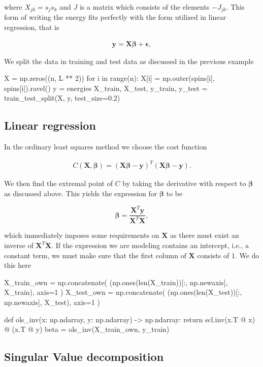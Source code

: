 \documentclass[%
oneside,                 %
final,                   %
10pt]{article}
\begin{document}
where $X_{jk} = s_j s_k$ and $J$ is a matrix which consists of the
elements $-J_{jk}$. This form of writing the energy fits perfectly
with the form utilized in linear regression, that is

\begin{align}
    \bm{y} = \bm{X}\bm{\beta} + \bm{\epsilon},
\end{align}

We split the data in training and test data as discussed in the previous example

\bpycod
X = np.zeros((n, L ** 2))
for i in range(n):
    X[i] = np.outer(spins[i], spins[i]).ravel()
y = energies
X_train, X_test, y_train, y_test = train_test_split(X, y, test_size=0.2)
\epycod

\subsection{Linear regression}

In the ordinary least squares method we choose the cost function

\begin{align}
    C(\bm{X}, \bm{\beta})= (\bm{X}\bm{\beta} - \bm{y})^T(\bm{X}\bm{\beta} - \bm{y}).
\end{align}

We then find the extremal point of $C$ by taking the derivative with respect to $\bm{\beta}$ as discussed above.
This yields the expression for $\bm{\beta}$ to be

\[
    \bm{\beta} = \frac{\bm{X}^T \bm{y}}{\bm{X}^T \bm{X}},
\]

which immediately imposes some requirements on $\bm{X}$ as there must exist
an inverse of $\bm{X}^T \bm{X}$. If the expression we are modeling contains an
intercept, i.e., a constant term, we must make sure that the
first column of $\bm{X}$ consists of $1$. We do this here

\bpycod
X_train_own = np.concatenate(
    (np.ones(len(X_train))[:, np.newaxis], X_train),
    axis=1
)
X_test_own = np.concatenate(
    (np.ones(len(X_test))[:, np.newaxis], X_test),
    axis=1
)
\epycod

\bpycod
def ols_inv(x: np.ndarray, y: np.ndarray) -> np.ndarray:
    return scl.inv(x.T @ x) @ (x.T @ y)
beta = ols_inv(X_train_own, y_train)
\epycod


\subsection{Singular Value decomposition}
\end{document}
